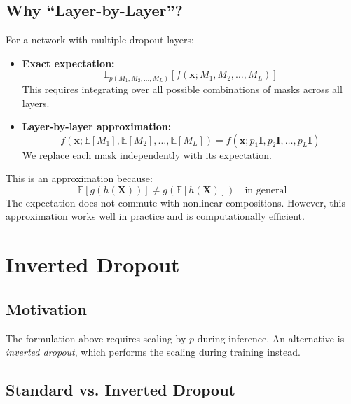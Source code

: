 \begin{notechapter}
\subsection{Why ``Layer-by-Layer''?}

For a network with multiple dropout layers:

\begin{itemize}
    \item \textbf{Exact expectation:} 
    \begin{equation}
    \mathbb{E}_{p(M_1, M_2, \ldots, M_L)}[f(\mathbf{x}; M_1, M_2, \ldots, M_L)]
    \end{equation}
    This requires integrating over all possible combinations of masks across all layers.
    
    \item \textbf{Layer-by-layer approximation:}
    \begin{equation}
    f(\mathbf{x}; \mathbb{E}[M_1], \mathbb{E}[M_2], \ldots, \mathbb{E}[M_L]) = f(\mathbf{x}; p_1\mathbf{I}, p_2\mathbf{I}, \ldots, p_L\mathbf{I})
    \end{equation}
    We replace each mask independently with its expectation.
\end{itemize}

\begin{remark}
This is an approximation because:
\begin{equation}
\mathbb{E}[g(h(\mathbf{X}))] \neq g(\mathbb{E}[h(\mathbf{X})]) \quad \text{in general}
\end{equation}
The expectation does not commute with nonlinear compositions. However, this approximation works well in practice and is computationally efficient.
\end{remark}

\section{Inverted Dropout}

\subsection{Motivation}

The formulation above requires scaling by $p$ during inference. An alternative is \emph{inverted dropout}, which performs the scaling during training instead.

\subsection{Standard vs. Inverted Dropout}


\end{notechapter}
